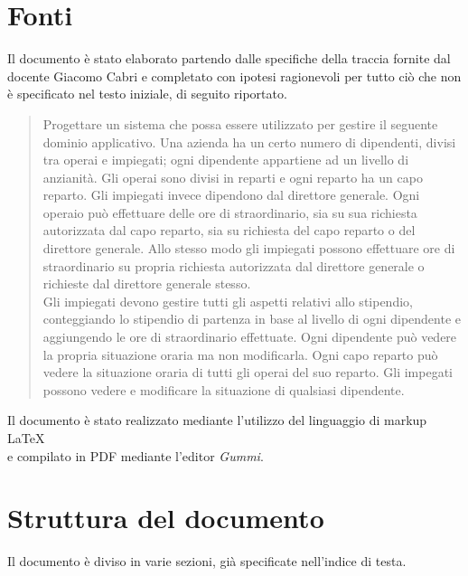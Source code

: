 \documentclass{scrreprt}
\begin{document}
\section{Fonti}
Il documento è stato elaborato partendo dalle specifiche della traccia fornite dal docente Giacomo Cabri e completato con ipotesi ragionevoli per tutto ciò che non è specificato nel testo iniziale, di seguito riportato.
\begin{quote}
Progettare un sistema che possa essere utilizzato per gestire il seguente dominio applicativo. Una azienda
ha un certo numero di dipendenti, divisi tra operai e impiegati; ogni dipendente appartiene ad un livello di
anzianità. Gli operai sono divisi in reparti e ogni reparto ha un capo reparto. Gli impiegati invece dipendono
dal direttore generale. Ogni operaio può effettuare delle ore di straordinario, sia su sua richiesta
autorizzata dal capo reparto, sia su richiesta del capo reparto o del direttore generale. Allo stesso modo gli
impiegati possono effettuare ore di straordinario su propria richiesta autorizzata dal direttore generale o
richieste dal direttore generale stesso.\\
Gli impiegati devono gestire tutti gli aspetti relativi allo stipendio, conteggiando lo stipendio di partenza in
base al livello di ogni dipendente e aggiungendo le ore di straordinario effettuate. Ogni dipendente può
vedere la propria situazione oraria ma non modificarla. Ogni capo reparto può vedere la situazione oraria di
tutti gli operai del suo reparto. Gli impegati possono vedere e modificare la situazione di qualsiasi
dipendente.
\end{quote}
Il documento è stato realizzato mediante l'utilizzo del linguaggio di markup \LaTeX\\ e compilato in PDF mediante l'editor \textit{Gummi}.


\pagebreak

\section{Struttura del documento}
Il documento è diviso in varie sezioni, già specificate nell'indice di testa.
\end{document}
